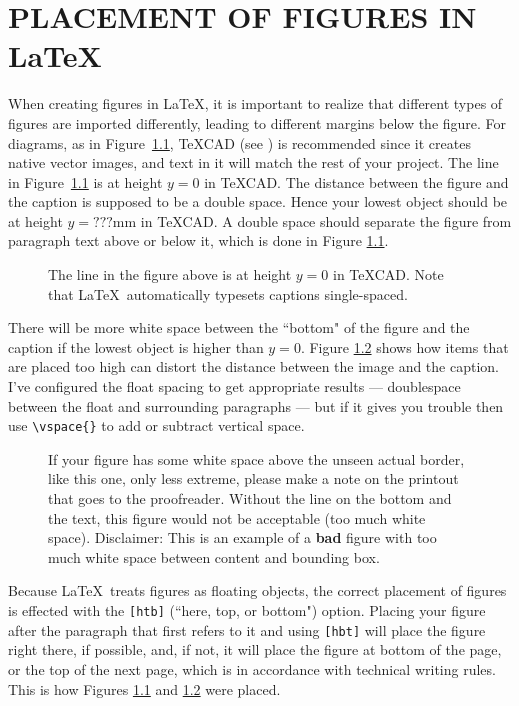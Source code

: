 \chapter{PLACEMENT OF FIGURES IN \LaTeX }\label{chap2:body1}


When creating figures in \LaTeX, it is important to realize that
different types of figures are imported differently, leading to
different margins below the figure.
For diagrams, as in Figure~\ref{pg1},
\TeX CAD (see \cite{texcad}) is recommended since it creates
native vector images, and text in it will match the rest of your project.
The line in Figure~\ref{pg1} is at height $y=0$ in \TeX CAD.
The distance between the figure and the caption is supposed to be
a double space.
Hence your lowest object should be at height $y=???$mm in \TeX CAD.
A double space should separate the figure from paragraph text
above or below it, which is done in Figure \ref{pg1}.

\begin{figure}[htb]
\centering

\caption{
The line in the figure above is at height $y=0$ in \TeX CAD.
Note that \LaTeX \ automatically typesets captions single-spaced.
}
\label{pg1}
\end{figure}

There will be more white space between the ``bottom" of the figure and
the caption if the lowest object is higher than $y=0$.
Figure \ref{pg3} shows how items that are placed too high can
distort the distance between the image and the caption.
I've configured the float spacing to get appropriate results
--- doublespace between the float and surrounding paragraphs --- but
if it gives you trouble then use \verb+\vspace{}+ to add or subtract
vertical space.

\begin{figure}[htb]
\centering

\caption{If your figure has some white space above the unseen actual border,
like this one, only less extreme, please make a note on the printout that
goes to the proofreader. Without the line on the bottom and the text,
this figure would not be acceptable (too much white space).
Disclaimer: This is an example of a {\bf bad} figure with too much
white space between content and bounding box.}
\label{pg3}

\end{figure}



Because \LaTeX \ treats figures as floating objects,
the correct placement of figures is effected with the
\verb+[htb]+ (``here, top, or bottom") option.
Placing your figure after the paragraph that first refers to it
and using \verb+[hbt]+ will place the figure right there, if possible, and,
if not, it will place the figure at bottom of the page, or
the top of the next page,
which is in accordance with technical writing rules.
This is how Figures \ref{pg1} and \ref{pg3} were placed.

